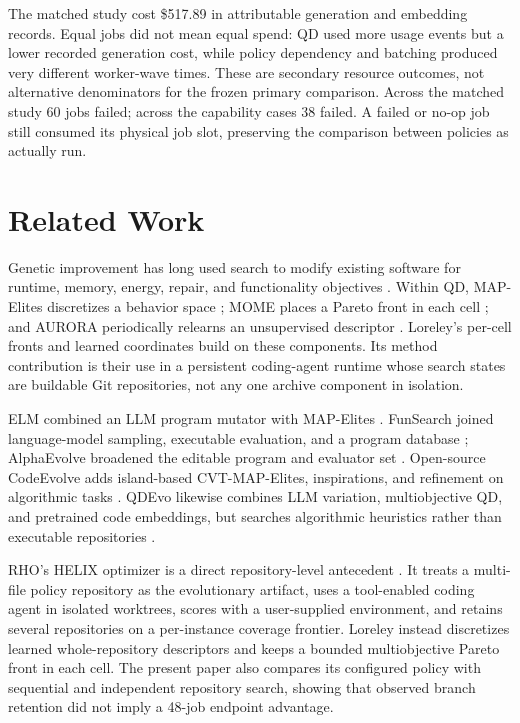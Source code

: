 \documentclass[10pt,twocolumn]{article}
\begin{document}
The matched study cost \$517.89 in attributable generation and embedding
records. Equal jobs did not mean equal spend: QD used more usage events but a
lower recorded generation cost, while policy dependency and batching produced
very different worker-wave times. These are secondary resource outcomes, not
alternative denominators for the frozen primary comparison. Across the matched
study 60 jobs failed; across the capability cases 38 failed. A failed or no-op
job still consumed its physical job slot, preserving the comparison between
policies as actually run.

\section{Related Work}

Genetic improvement has long used search to modify existing software for
runtime, memory, energy, repair, and functionality objectives
\citep{petke2018gi}. Within QD, MAP-Elites discretizes a behavior space
\citep{mouret2015mapelites}; MOME places a Pareto front in each cell
\citep{pierrot2022mome}; and AURORA periodically relearns an unsupervised
descriptor \citep{cully2019aurora}. Loreley's per-cell fronts and learned
coordinates build on these components. Its method contribution is their use in
a persistent coding-agent runtime whose search states are buildable Git
repositories, not any one archive component in isolation.

ELM combined an LLM program mutator with MAP-Elites
\citep{lehman2022elm}. FunSearch joined language-model sampling, executable
evaluation, and a program database \citep{romeraparedes2024funsearch};
AlphaEvolve broadened the editable program and evaluator set
\citep{novikov2025alphaevolve}. Open-source CodeEvolve adds island-based
CVT-MAP-Elites, inspirations, and refinement on algorithmic tasks
\citep{assumpcao2025codeevolve}. QDEvo likewise combines LLM variation,
multiobjective QD, and pretrained code embeddings, but searches algorithmic
heuristics rather than executable repositories \citep{khanh2026qdevo}.

RHO's HELIX optimizer is a direct repository-level antecedent
\citep{elmaaroufi2026rho}. It treats a multi-file policy repository as the
evolutionary artifact, uses a tool-enabled coding agent in isolated worktrees,
scores with a user-supplied environment, and retains several repositories on a
per-instance coverage frontier. Loreley instead discretizes learned
whole-repository descriptors and keeps a bounded multiobjective Pareto front in
each cell. The present paper also compares its configured policy with
sequential and independent repository search, showing that observed branch
retention did not imply a 48-job endpoint advantage.
\end{document}
